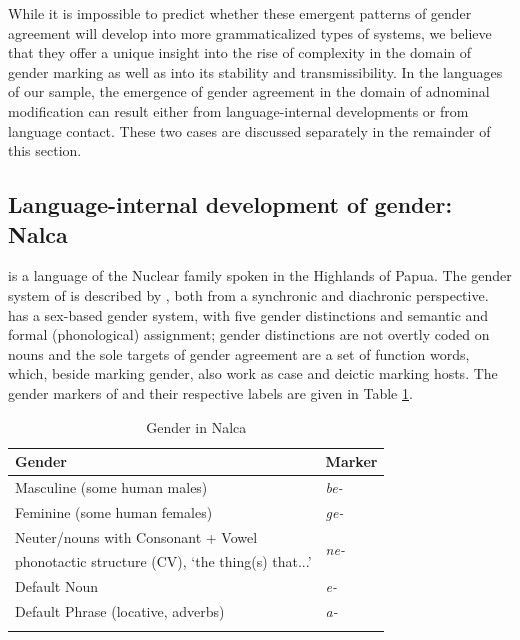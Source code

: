 \documentclass[output=collectionpaper]{langsci/langscibook}
\begin{document}
While it is impossible to predict whether these emergent patterns of gender agreement will develop into more grammaticalized types of systems, we believe that they offer a unique insight into the rise of complexity in the domain of gender marking as well as into its stability and transmissibility. In the languages of our sample, the emergence of gender agreement in the domain of adnominal modification can result either from language-internal developments or from language contact. These two cases are discussed separately in the remainder of this section.

\subsection{Language-internal development of gender: Nalca}
 is a  language of the Nuclear  family spoken in the Highlands of  Papua. The gender system of  is described by \citet{Waelchli2018}, both from a synchronic and diachronic perspective.  has a sex-based gender system, with five gender distinctions and semantic and formal (phonological) assignment; gender distinctions are not overtly coded on nouns and the sole targets of gender agreement are a set of function words, which, beside marking gender, also work as case and deictic marking hosts. The gender markers of  and their respective labels are given in Table \ref{tab:4:Nalca}.

 \begin{table}
\caption{Gender in Nalca}
\label{tab:4:Nalca}
 \begin{tabular}{ll} %
  \lsptoprule
Gender   & Marker \\ %
  \midrule
Masculine (some human males) & \textit{be-}\\
Feminine (some human females) & \textit{ge-} \\
Neuter/nouns with Consonant + Vowel  & \multirow{2}{*}{\textit{ne-}} \\
\quad phonotactic structure (CV), `the thing(s) that...' & \\
Default Noun & \textit{e-}\\
Default Phrase (locative, adverbs) & \textit{a-}\\
  \lspbottomrule
 \end{tabular}
\end{table}
\end{document}
